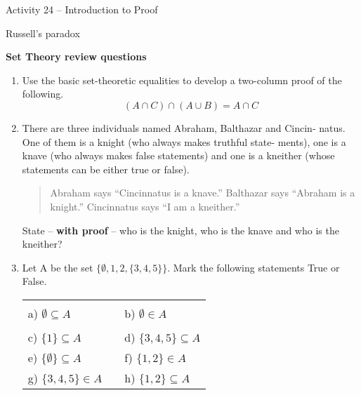 \documentclass{amsart}
\begin{document}
\thispagestyle{empty}

\centerline{\Large Activity 24 -- Introduction to Proof}
\centerline{\large Russell's paradox}

\bigskip
\Large

{\bf \large Set Theory review questions}
\begin{enumerate}

\item Use the basic set-theoretic equalities to develop a two-column proof
of the following.
\[
(A \cap C) \cap (A  \cup  B) = A \cap C
\]

\vfill

\item There are three individuals named Abraham, Balthazar and Cincin-
natus. One of them is a knight (who always makes truthful state-
ments), one is a knave (who always makes false statements) and
one is a kneither (whose statements can be either true or false).
\medskip

\begin{quotation}
Abraham says “Cincinnatus is a knave.”\newline
Balthazar says “Abraham is a knight.” \newline
Cincinnatus says “I am a kneither.” \newline
\end{quotation}

State – {\bf with proof} – who is the knight, who is the knave and
who is the kneither?

\vfill

\newpage

\item Let A be the set $\{\emptyset, 1, 2, \{3, 4, 5\}\}$. Mark the following statements \newline
True or False.

\begin{tabular}{lcl}
\rule{0pt}{84pt} a)  $ \emptyset \subseteq A $ & \rule{1.5in}{0in} & b)  $\emptyset \in A$\\
\rule{0pt}{84pt} c) $ \{1\}  \subseteq  A $ & & d) $\{3, 4, 5\}  \subseteq  A$\\
\rule{0pt}{84pt} e) $ \{ \emptyset \}  \subseteq  A $  & & f) $\{1, 2\}  \in  A$\\
\rule{0pt}{84pt} g) $ \{3, 4, 5\}  \in  A $ & & h) $\{1, 2\}  \subseteq  A$\\
\end{tabular}

\rule{0pt}{84pt}


\end{enumerate}
\end{document}
